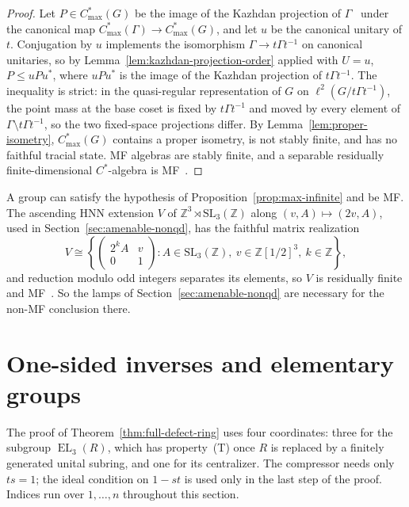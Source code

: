 \documentclass[11pt]{amsart}
\theoremstyle{plain}
\newcommand{\EL}{\operatorname{EL}}
\begin{document}
\begin{proof}
Let $P\in C^*_{\max}(G)$ be the image of the Kazhdan projection of
$\Gamma$~\cite{AkemannWalter} under the canonical map
$C^*_{\max}(\Gamma)\to C^*_{\max}(G)$, and let $u$ be the canonical
unitary of $t$.  Conjugation by $u$ implements the isomorphism
$\Gamma\to t\Gamma t^{-1}$ on canonical unitaries, so by
Lemma~\ref{lem:kazhdan-projection-order} applied with $U=u$,
$P\le uPu^{*}$, where $uPu^{*}$ is the image of the Kazhdan projection
of $t\Gamma t^{-1}$.  The inequality is strict: in the quasi-regular
representation of $G$ on $\ell^2(G/t\Gamma t^{-1})$, the point mass at
the base coset is fixed by $t\Gamma t^{-1}$ and moved by every element of
$\Gamma\setminus t\Gamma t^{-1}$, so the two fixed-space projections
differ.  By Lemma~\ref{lem:proper-isometry}, $C^*_{\max}(G)$ contains
a proper isometry, is not stably finite, and has no faithful tracial
state.  MF algebras are stably finite, and a separable residually
finite-dimensional $C^*$-algebra is MF~\cite{BK}.
\end{proof}

A group can satisfy the hypothesis of
Proposition~\ref{prop:max-infinite} and be MF\@.  The ascending HNN
extension $V$ of $\mathbb Z^3\rtimes\mathrm{SL}_3(\mathbb Z)$ along
$(v,A)\mapsto(2v,A)$, used in Section~\ref{sec:amenable-nonqd}, has the
faithful matrix realization
\[
 V\cong
 \left\{
 \begin{pmatrix}
 2^kA&v\\0&1
 \end{pmatrix}
 :A\in\mathrm{SL}_3(\mathbb Z),\
 v\in\mathbb Z[1/2]^3,\ k\in\mathbb Z
 \right\},
\]
and reduction modulo odd integers separates its elements, so $V$ is
residually finite and MF~\cite[Corollary~10]{Korchagin}.  So the lamps
of Section~\ref{sec:amenable-nonqd} are necessary for the non-MF
conclusion there.

\section{One-sided inverses and elementary groups}
\label{sec:one-sided-inverses}

The proof of Theorem~\ref{thm:full-defect-ring} uses four coordinates:
three for the subgroup $\EL_3(R)$, which has property~\textup{(T)} once
$R$ is replaced by a finitely generated unital subring, and one for its
centralizer.  The compressor needs only $ts=1$; the ideal condition on
$1-st$ is used only in the last step of the proof.  Indices run over
$1,\ldots,n$ throughout this section.
\end{document}
